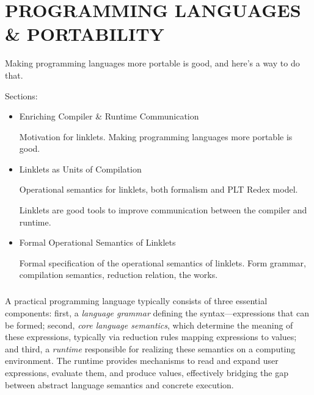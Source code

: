 \chapter[\texorpdfstring{PROGRAMMING LANGUAGES \& PORTABILITY}
                          {3. Linklets}]{PROGRAMMING LANGUAGES \& PORTABILITY}
\label{chapter:linklets}

	\begin{chaptersynopsis}
		\footnotesize

        Making programming languages more portable is good, and here's a way to do that.

        \vspace{2em}

        Sections:
		\begin{itemize}
			\item Enriching Compiler \& Runtime Communication

                Motivation for linklets. Making programming languages more portable is good.
			\item Linklets as Units of Compilation

                Operational semantics for linklets, both formalism and PLT Redex model.

				Linklets are good tools to improve communication between the compiler and runtime.
			\item Formal Operational Semantics of Linklets

				Formal specification of the operational semantics of linklets. Form grammar, compilation semantics, reduction relation, the works.
		\end{itemize}
    \end{chaptersynopsis}

	\paragraph{}%
  		A practical programming language typically consists of three essential components: first, a \emph{language grammar} defining the syntax—expressions that can be formed; second, \emph{core language semantics}, which determine the meaning of these expressions, typically via reduction rules mapping expressions to values; and third, a \emph{runtime} responsible for realizing these semantics on a computing environment. The runtime provides mechanisms to read and expand user expressions, evaluate them, and produce values, effectively bridging the gap between abstract language semantics and concrete execution.

